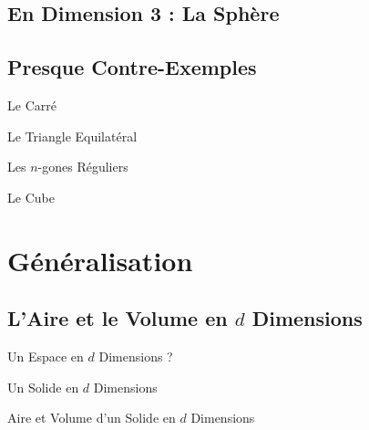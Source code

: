 \documentclass{beamercours}
\begin{document}
        \subsection{En Dimension 3 : La Sphère}

        \subsection{Presque Contre-Exemples}
            \begin{frame}{Le Carré}
                
            \end{frame}

            \begin{frame}{Le Triangle Equilatéral}
                
            \end{frame}

            \begin{frame}{Les $n$-gones Réguliers}
                
            \end{frame}

            \begin{frame}{Le Cube}
                
            \end{frame}

    \section{Généralisation}
        \subsection{L'Aire et le Volume en $d$ Dimensions}
            \begin{frame}{Un Espace en $d$ Dimensions ?}
                
            \end{frame}

            \begin{frame}{Un Solide en $d$ Dimensions}
                
            \end{frame}

            \begin{frame}{Aire et Volume d'un Solide en $d$ Dimensions}
                
            \end{frame}
\end{document}
